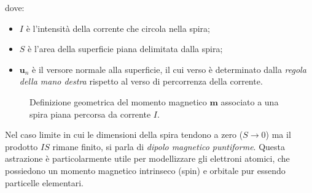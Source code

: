 \documentclass[a4paper,11pt]{report}
\begin{document}
dove:
\begin{itemize}
    \item $I$ è l'intensità della corrente che circola nella spira;
    \item $S$ è l'area della superficie piana delimitata dalla spira;
    \item $\bm{u}_n$ è il versore normale alla superficie, il cui verso è determinato dalla \textit{regola della mano destra} rispetto al verso di percorrenza della corrente.
\end{itemize}
\begin{figure}[htbp]
    \centering
    \caption{Definizione geometrica del momento magnetico $\bm{m}$ associato a una spira piana percorsa da corrente $I$.}
    \label{fig:def_momento_m}
\end{figure}
Nel caso limite in cui le dimensioni della spira tendono a zero ($S \to 0$) ma il prodotto $IS$ rimane finito, si parla di \textit{dipolo magnetico puntiforme}. Questa astrazione è particolarmente utile per modellizzare gli elettroni atomici, che possiedono un momento magnetico intrinseco (spin) e orbitale pur essendo particelle elementari.
\end{document}

